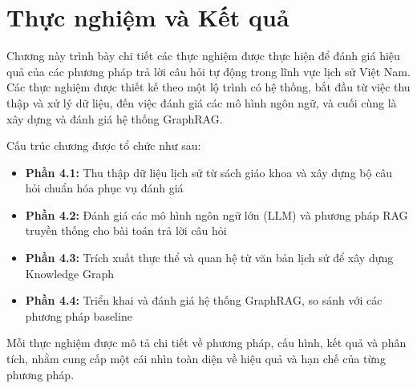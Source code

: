 \chapter{Thực nghiệm và Kết quả}
\label{chap:experiments}

Chương này trình bày chi tiết các thực nghiệm được thực hiện để đánh giá hiệu quả của các phương pháp trả lời câu hỏi tự động trong lĩnh vực lịch sử Việt Nam. Các thực nghiệm được thiết kế theo một lộ trình có hệ thống, bắt đầu từ việc thu thập và xử lý dữ liệu, đến việc đánh giá các mô hình ngôn ngữ, và cuối cùng là xây dựng và đánh giá hệ thống GraphRAG.

Cấu trúc chương được tổ chức như sau:
\begin{itemize}
    \item \textbf{Phần 4.1:} Thu thập dữ liệu lịch sử từ sách giáo khoa và xây dựng bộ câu hỏi chuẩn hóa phục vụ đánh giá
    \item \textbf{Phần 4.2:} Đánh giá các mô hình ngôn ngữ lớn (LLM) và phương pháp RAG truyền thống cho bài toán trả lời câu hỏi
    \item \textbf{Phần 4.3:} Trích xuất thực thể và quan hệ từ văn bản lịch sử để xây dựng Knowledge Graph
    \item \textbf{Phần 4.4:} Triển khai và đánh giá hệ thống GraphRAG, so sánh với các phương pháp baseline
\end{itemize}

Mỗi thực nghiệm được mô tả chi tiết về phương pháp, cấu hình, kết quả và phân tích, nhằm cung cấp một cái nhìn toàn diện về hiệu quả và hạn chế của từng phương pháp.




